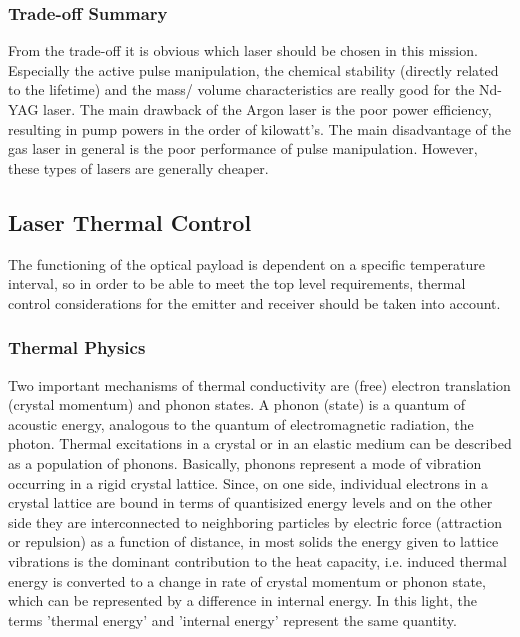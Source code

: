 	\subsubsection{Trade-off Summary}
From the trade-off it is obvious which \acs{laser} should be chosen in this mission. Especially the active pulse manipulation, the chemical stability (directly related to the lifetime) and the mass/ volume characteristics are really good for the Nd-YAG \acs{laser}. The main drawback of the Argon \acs{laser} is the poor power efficiency, resulting in pump powers in the order of kilowatt's. The main disadvantage of the gas \acs{laser} in general is the poor performance of pulse manipulation. However, these types of \acs{laser}s are generally cheaper. 
	
	\subsection{Laser Thermal Control}
	\label{mtLSRthermal}
\cite{lasertech}The functioning of the optical payload is dependent on a specific temperature interval, so in order to be able to meet the top level requirements, thermal control considerations for the emitter and receiver should be taken into account. 

\subsubsection{Thermal Physics}
	\label{mtLSRthermalphysics}
Two important mechanisms of thermal conductivity are (free) electron translation (crystal momentum) and phonon states. A phonon (state) is a quantum of acoustic energy, analogous to the quantum of electromagnetic radiation, the photon. Thermal excitations in a crystal or in an elastic medium can be described as a population of phonons. Basically, phonons represent a mode of vibration occurring in a rigid crystal lattice. Since, on one side, individual electrons in a crystal lattice are bound in terms of quantisized energy levels and on the other side they are interconnected to neighboring particles by electric force (attraction or repulsion) as a function of distance, in most solids the energy given to lattice vibrations is the dominant contribution to the heat capacity, i.e. induced thermal energy is converted to a change in rate of crystal momentum or phonon state, which can be represented by a difference in internal energy. In this light, the terms 'thermal energy' and 'internal energy' represent the same quantity. 

